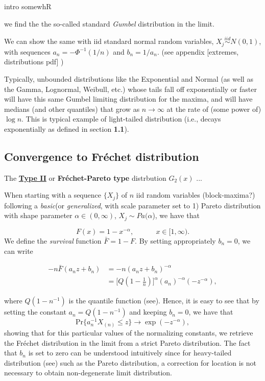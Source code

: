 \documentclass[11pt,a4paper,openany ]{book}
\begin{document}
intro \cite{falk_laws_2011} somewhR

we find the the so-called standard \emph{Gumbel} distribution in the limit. 

We can show the same with iid standard normal random variables, $X_j\stackrel{iid}{\sim}N(0,1)$, with sequences $a_n=-\Phi^{-1}(1/n)$ and $b_n=1/a_n$. (see appendix [extremes, distributions  pdf] )

Typically, unbounded distributions like the Exponential and Normal (as well
as the Gamma, Lognormal, Weibull, etc.) whose tails fall off exponentially
or faster will have this same Gumbel limiting distribution for the maxima,
and will have medians (and other quantiles) that grow as $n\rightarrow\infty$ at the rate
of (some power of) $\log n$. This is typical example of light-tailed distribution (i.e., decays exponentially as defined in section \textbf{1.1}).

\subsection*{Convergence to Fréchet distribution}

The \textbf{\underline{Type II}} or \textbf{Fréchet-Pareto type} distrbution $G_2(x)$  ...

When starting with a sequence $\{X_j\}$ of $n$ iid random variables (block-maxima?) following a \textit{basic}(or \textit{generalized}, with scale parameter set to 1) Pareto distribution with shape parameter $\alpha\in (0,\infty)$, $X_j\sim Pa(\alpha$), we have that 

\begin{equation}
F(x)=1-x^{-\alpha}, \ \ \ \ \ \ \ \ \ \ \ \ \ \ x\in[1,\infty).
\end{equation}
We define the \textit{survival} function $\bar{F}=1-F$. By setting appropriately $b_n=0$, we can write

\begin{equation*}
\begin{aligned}
-n\bar{F}(a_nz+b_n)
& =-n(a_nz+b_n)^{-\alpha} \\
& =\Big[Q(1-\frac{1}{n})\Big]^{\alpha}(a_n)^{-\alpha}(-z^{-\alpha}),
\end{aligned}
\end{equation*}

where $Q(1-n^{-1})$ is the quantile function (see). Hence, it is easy to see that by setting the constant $a_n=Q(1-n^{-1})$ and keeping $b_n=0$, we have that 
\begin{equation*}
\text{Pr}\{a_n^{-1}X_{(n)}\leq z\}\rightarrow \exp (-z^{-\alpha}),
\end{equation*}
showing that for this particular values of the normalizing constants, we retrieve the Fréchet distribution in the limit from a strict Pareto distribution. The fact that $b_n$ is set to zero can be understood intuitively since for heavy-tailed distribution (see) such as the Pareto distribution, a correction for location is not necessary to obtain non-degenerate limit distribution. \cite[pp.51]{beirlant_practical_1996}
\end{document}
